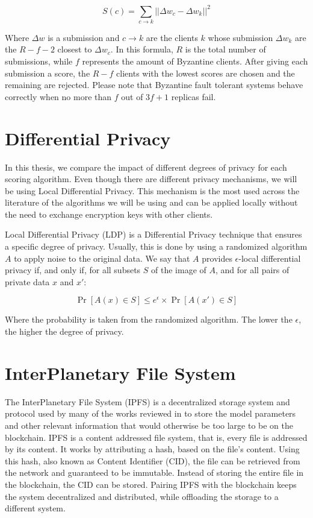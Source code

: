 \begin{equation}
    \label{eq:multi-krum}
    S(c)=\sum_{c \rightarrow k} || \Delta w_c - \Delta w_k|| ^2
\end{equation}

Where $\Delta w$ is a submission and $c \rightarrow k$ are the clients $k$ whose submission $\Delta w_k$ are the $R-f-2$ closest to $\Delta w_c$. In this formula, $R$ is the total number of submissions, while $f$ represents the amount of Byzantine clients. After giving each submission a score, the $R-f$ clients with the lowest scores are chosen and the remaining are rejected. Please note that Byzantine fault tolerant systems behave correctly when no more than $f$ out of $3f+1$ replicas fail.

\section{Differential Privacy}\label{background:diff_priv}

In this thesis, we compare the impact of different degrees of privacy for each scoring algorithm. Even though there are different privacy mechanisms, we will be using Local Differential Privacy. This mechanism is the most used across the literature of the algorithms we will be using and can be applied locally without the need to exchange encryption keys with other clients.

Local Differential Privacy (LDP) is a Differential Privacy technique that ensures a specific degree of privacy. Usually, this is done by using a randomized algorithm $A$ to apply noise to the original data. We say that $A$ provides $\epsilon$-local differential privacy if, and only if, for all subsets $S$ of the image of $A$, and for all pairs of private data $x$ and $x'$:

\begin{equation}
    \label{eq:e-ldp}
    \Pr[A(x) \in S] \leq e^\epsilon \times \Pr[A(x') \in S]
\end{equation}

Where the probability is taken from the randomized algorithm. The lower the $\epsilon$, the higher the degree of privacy.

\section{InterPlanetary File System}\label{background:ipfs}

The InterPlanetary File System (IPFS) \cite{10.48550/arxiv.1407.3561} is a decentralized storage system and protocol used by many of the works reviewed in  to store the model parameters and other relevant information that would otherwise be too large to be on the blockchain. IPFS is a content addressed file system, that is, every file is addressed by its content. It works by attributing a hash, based on the file's content. Using this hash, also known as Content Identifier (CID), the file can be retrieved from the network and guaranteed to be immutable. Instead of storing the entire file in the blockchain, the CID can be stored. Pairing IPFS with the blockchain keeps the system decentralized and distributed, while offloading the storage to a different system.
